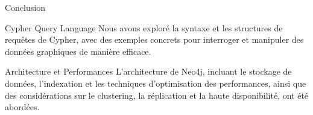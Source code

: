 \begin{frame}{Conclusion }
  \begin{block}{Cypher Query Language}
    Nous avons exploré la syntaxe et les structures de requêtes de Cypher, avec des exemples concrets pour interroger et manipuler des données graphiques de manière efficace.
  \end{block}
  
  \begin{block}{Architecture et Performances}
    L'architecture de Neo4j, incluant le stockage de données, l'indexation et les techniques d'optimisation des performances, ainsi que des considérations sur le clustering, la réplication et la haute disponibilité, ont été abordées.
  \end{block}
\end{frame}